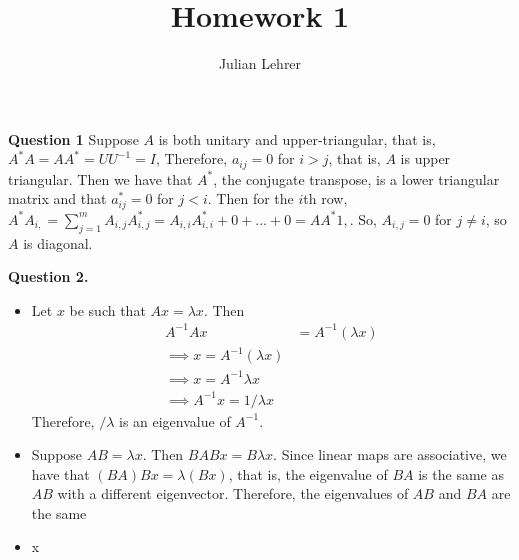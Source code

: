 \documentclass{article}
\title{Homework 1}
\date{}
\author{Julian Lehrer}
\begin{document}
\maketitle
\textbf{Question 1}
Suppose $A$ is both unitary and upper-triangular, that is,
$A^*A=AA^*=UU^{-1}=I$, Therefore, $a_{ij} = 0$ for $i > j$, that is, $A$ is upper triangular. Then we have that $A^*$, the conjugate transpose, is a lower triangular matrix and that $a^*_{ij} = 0$ for $j < i$. Then for the $i$th row, $A^*A_{i, } = \sum_{j=1}^m A_{i, j}A^*_{i, j}=A_{i, i}A^{*}_{i, i }+ 0+...+0 = AA^*{1, }$. So, $A_{i,j}=0$ for $j \neq i$, so $A$ is diagonal. 

\textbf{Question 2.} 
\begin{itemize}
    \item Let $x$ be such that $Ax =\lambda x$. Then 
    \begin{align*}
        A^{-1}Ax &= A^{-1}\left(\lambda x\right) \\ 
        \implies x = A^{-1}\left(\lambda x\right)\\
        \implies x=A^{-1}\lambda x \\
        \implies A^{-1}x = 1/\lambda x
    \end{align*}
    Therefore, $/\lambda$ is an eigenvalue of $A^{-1}$. 
    \item Suppose $AB = \lambda x$. Then $BAB x= B\lambda x$. Since linear maps are associative, we have that $(BA)Bx = \lambda(Bx)$, that is, the eigenvalue of $BA$ is the same as $AB$ with a different eigenvector. Therefore, the eigenvalues of $AB$ and $BA$ are the same 
    \item x
\end{itemize}
\end{document}
